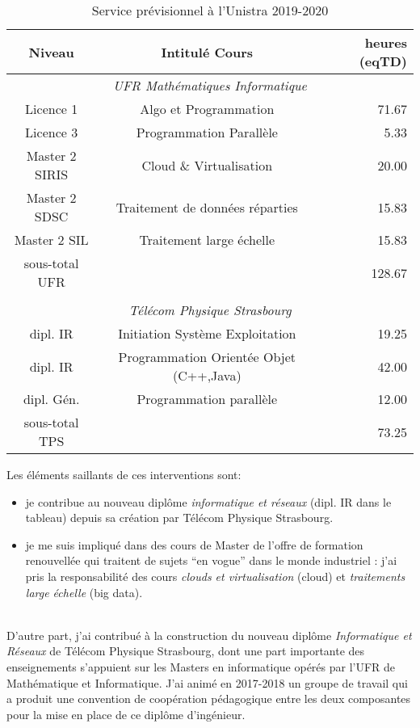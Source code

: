\begin{table}[hbt]
\label{tb:ens}
\begin{center}
\begin{tabular}{ccr}						
Niveau  & Intitulé Cours & heures (eqTD) \\
\hline
\multicolumn{3}{c}{\textit{UFR Mathématiques Informatique}}\\
\hline
Licence 1 & Algo et Programmation & 	71.67 \\
Licence 3 & Programmation Parallèle &	5.33 \\
Master 2 SIRIS & Cloud \& Virtualisation &	20.00 \\
Master 2 SDSC & Traitement de données réparties	&	15.83 \\
Master 2 SIL  & Traitement  large échelle & 15.83 \\
\hline
sous-total UFR &                 & 128.67 \\
& & \\ 
\hline		
\multicolumn{3}{c}{\textit{Télécom Physique Strasbourg}}\\
\hline
dipl. IR & Initiation Système Exploitation &        19.25 \\
dipl. IR &  Programmation Orientée Objet (C++,Java) &	42.00 \\
dipl. Gén. &Programmation parallèle	       &	12.00 \\
\hline
sous-total TPS	       &       & 73.25 \\
\end{tabular}	
\caption{Service prévisionnel à l'Unistra 2019-2020} 
\end{center}
\end{table}
Les éléments saillants de ces interventions sont:
\begin{itemize}
\item je contribue  au nouveau diplôme \emph{informatique et  réseaux} (dipl. IR
  dans le tableau) depuis sa création par Télécom Physique Strasbourg.
\item je me suis impliqué dans des cours de Master de l'offre de formation renouvellée
qui traitent de sujets ``en vogue'' dans le monde industriel : j'ai pris la
responsabilité des cours \emph{clouds et virtualisation} (cloud) et \emph{traitements
  large échelle} (big data).
\end{itemize}\\

\medskip
D'autre   part,  j'ai   contribué   à  la   construction   du  nouveau   diplôme
\emph{Informatique et  Réseaux} de  Télécom Physique  Strasbourg, dont  une part
importante des enseignements  s'appuient sur les Masters  en informatique opérés
par l'UFR de Mathématique et Informatique.  J'ai animé en 2017-2018 un groupe de
travail qui a  produit une convention de coopération pédagogique  entre les deux
composantes pour la mise en place de ce diplôme d'ingénieur.



